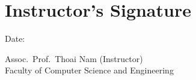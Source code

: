 \chapter*{Instructor’s Signature}

\vspace{1cm}

\makebox[0.7\linewidth][l]{\hrulefill} Date: \makebox[0.2\linewidth][l]{\hrulefill}

    \begin{flushleft}
    Assoc.\ Prof.\ Thoai Nam (Instructor)\\
    Faculty of Computer Science and Engineering
    \end{flushleft}